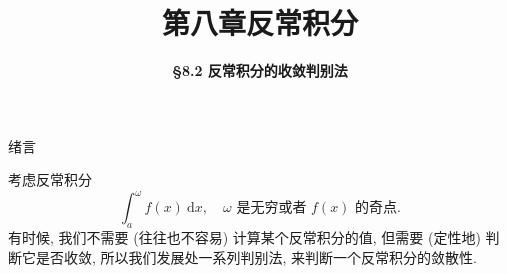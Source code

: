 \everymath{\displaystyle}



\title[第八章\\
反常积分]{\texorpdfstring{\LARGE \bfseries 第八章\quad 反常积分}{第八章 反常积分}} %
\author[\smaller \S 8.2\\
收敛判别法] %
{\Large \bfseries \S 8.2 反常积分的收敛判别法}
\date{}





\begin{frame}

\titlepage %

\end{frame}





\begin{frame}{绪言}

{
\larger[1]

考虑反常积分
\begin{equation*}
\int_a^{\omega} f(x) ~ \mathrm{d} x, \quad \text{$\omega$ 是无穷或者 $f(x)$ 的奇点.}
\end{equation*}
有时候, 我们不需要 (往往也不容易) 计算某个反常积分的值, 但需要 (\alert{定性地}) 判断它是否收敛, 所以我们发展处一系列判别法, 来判断一个反常积分的敛散性.
}

\end{frame}

